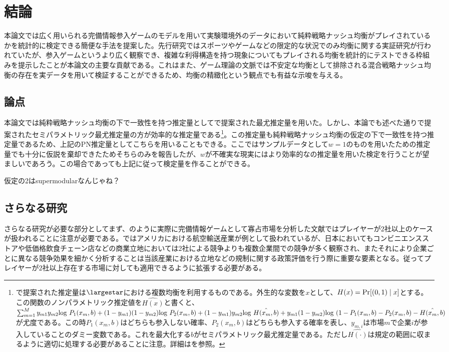 
\chapter{結論}
本論文では広く用いられる完備情報参入ゲームのモデルを用いて実験環境外のデータにおいて純粋戦略ナッシュ均衡がプレイされているかを統計的に検定できる簡便な手法を提案した。先行研究ではスポーツやゲームなどの限定的な状況でのみ均衡に関する実証研究が行われていたが、参入ゲームというより広く観察でき、複雑な利得構造を持つ現象についてもプレイされる均衡を統計的にテストできる枠組みを提示したことが本論文の主要な貢献である。これはまた、ゲーム理論の文脈では不安定な均衡として排除される混合戦略ナッシュ均衡の存在を実データを用いて検証することができるため、均衡の精緻化という観点でも有益な示唆を与える。

\section{論点}
本論文では純粋戦略ナッシュ均衡の下で一致性を持つ推定量として\cite{Bresnahan1991}で提案された最尤推定量を用いた。しかし、本論でも述べた通り\cite{Tamer2003a}で提案されたセミパラメトリック最尤推定量の方が効率的な推定量である\footnote{\cite{Tamer2003a}で提案された推定量は$\largestar$における複数均衡を利用するものである。外生的な変数を$x$として、$H(x) = {\rm Pr}[(0,1)\mid x]$とする。この関数のノンパラメトリック推定値を$\hat{H(x)}$と書くと、$\sum_{m = 1}^{M} y_{m1}y_{m2} {\rm log}\ P_1(x_m, b) + (1-y_{m1})(1-y_{m2}) {\rm log}\ P_2(x_m, b) + (1-y_{m1})y_{m2} {\rm log}\ \hat{H(x_m, b)} + y_{m1}(1-y_{m2}) {\rm log}\ (1-P_1(x_m, b)-P_2(x_m, b) - \hat{H(x_m, b)}$が尤度である。この時$P_1(x_m, b)$はどちらも参入しない確率、$P_2(x_m, b)$はどちらも参入する確率を表し、$y_{m, i}$は市場$m$で企業$i$が参入していることのダミー変数である。これを最大化する$b$がセミパラメトリック最尤推定量である。ただし$\hat{H(\cdot)}$は規定の範囲に収まるように適切に処理する必要があることに注意。詳細は\cite{Tamer2003a}を参照。}。この推定量も純粋戦略ナッシュ均衡の仮定の下で一致性を持つ推定量であるため、上記のPN推定量としてこちらを用いることもできる。ここではサンプルデータとして$w = 1$のものを用いたため\cite{Bresnahan1991}の推定量でも十分に仮説を棄却できたためそちらのみを報告したが、$w$が不確実な現実にはより効率的な\cite{Tamer2003a}の推定量を用いた検定を行うことが望ましいであろう。この場合であっても上記に従って検定量を作ることができる。

仮定の2はsupermodularなんじゃね？

\section{さらなる研究}
さらなる研究が必要な部分としてまず、\cite{Ciliberto2009a}のように実際に完備情報ゲームとして寡占市場を分析した文献ではプレイヤーが$2$社以上のケースが扱われることに注意が必要である。\cite{Ciliberto2009a}ではアメリカにおける航空輸送産業が例として扱われているが、日本においてもコンビニエンスストアや低価格飲食チェーン店などの商業立地においては$2$社による競争よりも複数企業間での競争が多く観察され、またそれにより企業ごとに異なる競争効果を細かく分析することは当該産業における立地などの規制に関する政策評価を行う際に重要な要素となる。従ってプレイヤーが$2$社以上存在する市場に対しても適用できるように拡張する必要がある。

